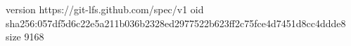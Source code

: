 version https://git-lfs.github.com/spec/v1
oid sha256:057df5d6c22e5a211b036b2328ed2977522b623ff2c75fce4d7451d8cc4ddde8
size 9168

